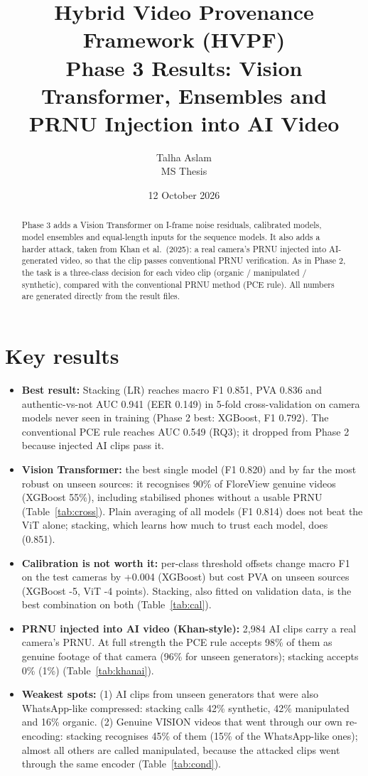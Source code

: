 \documentclass[11pt,a4paper]{article}
\title{\textbf{Hybrid Video Provenance Framework (HVPF)}\\[3pt]\large Phase 3 Results: Vision Transformer, Ensembles and PRNU Injection into AI Video}
\author{Talha Aslam\\ MS Thesis}
\date{12 October 2026}
\begin{document}
\maketitle
\begin{abstract}\noindent
Phase 3 adds a Vision Transformer on I-frame noise residuals, calibrated models, model ensembles and
equal-length inputs for the sequence models. It also adds a harder attack, taken from Khan et al.\ (2025):
a real camera's PRNU injected into AI-generated video, so that the clip passes conventional PRNU verification.
As in Phase 2, the task is a three-class decision for each video clip (organic / manipulated / synthetic),
compared with the conventional PRNU method (PCE rule).
All numbers are generated directly from the result files.
\end{abstract}
\section{Key results}\begin{itemize}
\item \textbf{Best result:} Stacking (LR) reaches macro F1 0.851, PVA 0.836 and authentic-vs-not AUC 0.941 (EER 0.149) in 5-fold cross-validation on camera models never seen in training (Phase 2 best: XGBoost, F1 0.792). The conventional PCE rule reaches AUC 0.549 (RQ3); it dropped from Phase 2 because injected AI clips pass it.
\item \textbf{Vision Transformer:} the best single model (F1 0.820) and by far the most robust on unseen sources: it recognises 90\% of FloreView genuine videos (XGBoost 55\%), including stabilised phones without a usable PRNU (Table~\ref{tab:cross}). Plain averaging of all models (F1 0.814) does not beat the ViT alone; stacking, which learns how much to trust each model, does (0.851).
\item \textbf{Calibration is not worth it:} per-class threshold offsets change macro F1 on the test cameras by +0.004 (XGBoost) but cost PVA on unseen sources (XGBoost -5, ViT -4 points). Stacking, also fitted on validation data, is the best combination on both (Table~\ref{tab:cal}).
\item \textbf{PRNU injected into AI video (Khan-style):} 2,984 AI clips carry a real camera's PRNU. At full strength the PCE rule accepts 98\% of them as genuine footage of that camera (96\% for unseen generators); stacking accepts 0\% (1\%) (Table~\ref{tab:khanai}).
\item \textbf{Weakest spots:} (1) AI clips from unseen generators that were also WhatsApp-like compressed: stacking calls 42\% synthetic, 42\% manipulated and 16\% organic. (2) Genuine VISION videos that went through our own re-encoding: stacking recognises 45\% of them (15\% of the WhatsApp-like ones); almost all others are called manipulated, because the attacked clips went through the same encoder (Table~\ref{tab:cond}).

\end{itemize}
\end{document}
